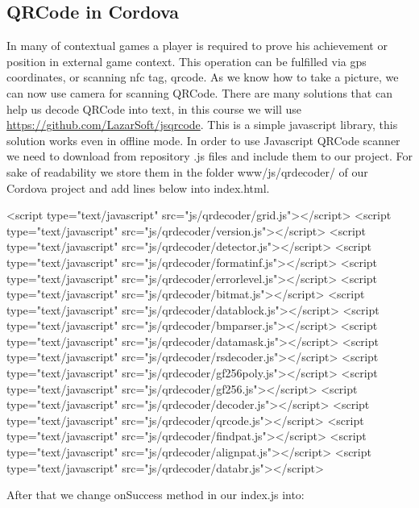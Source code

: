  \subsection{QRCode in Cordova}

 In many of contextual games a player is required to prove his achievement or position in external game context. This operation can be fulfilled via gps coordinates, or scanning nfc tag, qrcode. As we know how to take a picture, we can now use camera for scanning QRCode. There are many solutions that can help us decode QRCode into text, in this course we will use \url{https://github.com/LazarSoft/jsqrcode}. This is a simple javascript library, this solution works even in offline mode. In order to use Javascript QRCode scanner  we need to download from repository .js files and include them to our project. For sake of readability we store them in the folder www/js/qrdecoder/ of our Cordova project and add lines below into index.html.

\begin{html}
<script type="text/javascript" src="js/qrdecoder/grid.js"></script>
<script type="text/javascript" src="js/qrdecoder/version.js"></script>
<script type="text/javascript" src="js/qrdecoder/detector.js"></script>
<script type="text/javascript" src="js/qrdecoder/formatinf.js"></script>
<script type="text/javascript" src="js/qrdecoder/errorlevel.js"></script>
<script type="text/javascript" src="js/qrdecoder/bitmat.js"></script>
<script type="text/javascript" src="js/qrdecoder/datablock.js"></script>
<script type="text/javascript" src="js/qrdecoder/bmparser.js"></script>
<script type="text/javascript" src="js/qrdecoder/datamask.js"></script>
<script type="text/javascript" src="js/qrdecoder/rsdecoder.js"></script>
<script type="text/javascript" src="js/qrdecoder/gf256poly.js"></script>
<script type="text/javascript" src="js/qrdecoder/gf256.js"></script>
<script type="text/javascript" src="js/qrdecoder/decoder.js"></script>
<script type="text/javascript" src="js/qrdecoder/qrcode.js"></script>
<script type="text/javascript" src="js/qrdecoder/findpat.js"></script>
<script type="text/javascript" src="js/qrdecoder/alignpat.js"></script>
<script type="text/javascript" src="js/qrdecoder/databr.js"></script>
\end{html}

After that we change onSuccess method in our index.js into:

